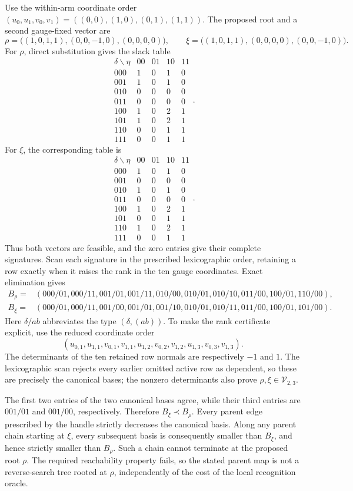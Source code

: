 Use the within-arm coordinate order \((u_0,u_1,v_0,v_1)=((0,0),(1,0),(0,1),(1,1))\). The proposed root and a second gauge-fixed vector are
\[
\rho=\bigl((1,0,1,1),(0,0,-1,0),(0,0,0,0)\bigr),\qquad \xi=\bigl((1,0,1,1),(0,0,0,0),(0,0,-1,0)\bigr).
\]
For \(\rho\), direct substitution gives the slack table
\[
\begin{array}{c|rrrr}
\delta\backslash\eta&00&01&10&11\\ \hline
000&1&0&1&0\\ 001&1&0&1&0\\ 010&0&0&0&0\\ 011&0&0&0&0\\
100&1&0&2&1\\ 101&1&0&2&1\\ 110&0&0&1&1\\ 111&0&0&1&1
\end{array}.
\]
For \(\xi\), the corresponding table is
\[
\begin{array}{c|rrrr}
\delta\backslash\eta&00&01&10&11\\ \hline
000&1&0&1&0\\ 001&0&0&0&0\\ 010&1&0&1&0\\ 011&0&0&0&0\\
100&1&0&2&1\\ 101&0&0&1&1\\ 110&1&0&2&1\\ 111&0&0&1&1
\end{array}.
\]
Thus both vectors are feasible, and the zero entries give their complete signatures. Scan each signature in the prescribed lexicographic order, retaining a row exactly when it raises the rank in the ten gauge coordinates. Exact elimination gives
\[
\begin{aligned}
B_\rho={}&(000/01,000/11,001/01,001/11,010/00,010/01,010/10,011/00,100/01,110/00),\\
B_\xi={}&(000/01,000/11,001/00,001/01,001/10,010/01,010/11,011/00,100/01,101/00).
\end{aligned}
\]
Here \(\delta/ab\) abbreviates the type \((\delta,(ab))\). To make the rank certificate explicit, use the reduced coordinate order
\[
(u_{0,1},u_{1,1},v_{0,1},v_{1,1},u_{1,2},v_{0,2},v_{1,2},u_{1,3},v_{0,3},v_{1,3}).
\]
The determinants of the ten retained row normals are respectively \(-1\) and \(1\). The lexicographic scan rejects every earlier omitted active row as dependent, so these are precisely the canonical bases; the nonzero determinants also prove \(\rho,\xi\in\mathcal V_{2,3}\).

The first two entries of the two canonical bases agree, while their third entries are \(001/01\) and \(001/00\), respectively. Therefore \(B_\xi\prec B_\rho\). Every parent edge prescribed by the handle strictly decreases the canonical basis. Along any parent chain starting at \(\xi\), every subsequent basis is consequently smaller than \(B_\xi\), and hence strictly smaller than \(B_\rho\). Such a chain cannot terminate at the proposed root \(\rho\). The required reachability property fails, so the stated parent map is not a reverse-search tree rooted at \(\rho\), independently of the cost of the local recognition oracle.